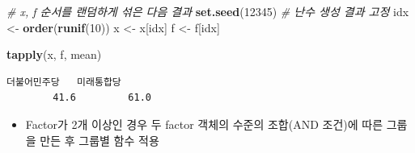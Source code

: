 \documentclass[
  11pt,
]{krantz}
\newenvironment{Shaded}{\begin{snugshade}}{\end{snugshade}}
\newcommand{\CommentTok}[1]{\textcolor[rgb]{0.37,0.37,0.37}{\textit{#1}}}
\newcommand{\DecValTok}[1]{\textcolor[rgb]{0.06,0.06,0.06}{#1}}
\newcommand{\KeywordTok}[1]{\textcolor[rgb]{0.27,0.27,0.27}{\textbf{#1}}}
\newcommand{\NormalTok}[1]{#1}
\newcommand{\StringTok}[1]{\textcolor[rgb]{0.5,0.5,0.5}{#1}}
\providecommand{\tightlist}{%
  \setlength{\itemsep}{0pt}\setlength{\parskip}{0pt}}
\begin{document}
\begin{Shaded}
\begin{Highlighting}[]
\CommentTok{# x, f 순서를 랜덤하게 섞은 다음 결과}
\KeywordTok{set.seed}\NormalTok{(}\DecValTok{12345}\NormalTok{) }\CommentTok{# 난수 생성 결과 고정}
\NormalTok{idx <-}\StringTok{ }\KeywordTok{order}\NormalTok{(}\KeywordTok{runif}\NormalTok{(}\DecValTok{10}\NormalTok{))}
\NormalTok{x <-}\StringTok{ }\NormalTok{x[idx]}
\NormalTok{f <-}\StringTok{ }\NormalTok{f[idx]}

\KeywordTok{tapply}\NormalTok{(x, f, mean)}
\end{Highlighting}
\end{Shaded}

\begin{verbatim}
더불어민주당   미래통합당 
        41.6         61.0 
\end{verbatim}

\normalsize

\begin{itemize}
\tightlist
\item
  Factor가 2개 이상인 경우 두 factor 객체의 수준의 조합(AND 조건)에 따른 그룹을 만든 후 그룹별 함수 적용
\end{itemize}

\footnotesize
\end{document}
